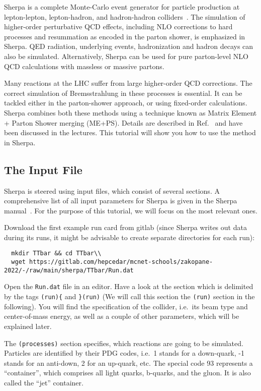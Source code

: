 \documentclass[10pt]{article}
\begin{document}
Sherpa is a complete Monte-Carlo event generator for particle production at
lepton-lepton, lepton-hadron, and hadron-hadron colliders~\cite{Gleisberg:2008ta}.
The simulation of higher-order perturbative QCD effects, including NLO corrections 
to hard processes and resummation as encoded in the parton shower, is emphasized 
in Sherpa. QED radiation, underlying events, hadronization and hadron decays can
also be simulated. Alternatively, Sherpa can be used for pure parton-level NLO QCD 
calculations with massless or massive partons.

Many reactions at the LHC suffer from large higher-order QCD corrections.
The correct simulation of Bremsstrahlung in these processes is essential. It can 
be tackled either in the parton-shower approach, or using fixed-order calculations.
Sherpa combines both these methods using a technique known as Matrix Element + 
Parton Shower merging (ME+PS). Details are described in Ref.~\cite{Buckley:2011ms}
and have been discussed in the lectures. This tutorial will show
you how to use the method in Sherpa.

\subsection{The Input File}

Sherpa is steered using input files, which consist of several sections.
A comprehensive list of all input parameters for Sherpa is given in the
Sherpa manual~\cite{SherpaManual}. For the purpose of this tutorial, 
we will focus on the most relevant ones.

Download the first example run card from gitlab (since Sherpa writes out data
during its runs, it might be advisable to create separate directories for each run):
%
\begin{verbatim}
  mkdir TTbar && cd TTbar\\
  wget https://gitlab.com/hepcedar/mcnet-schools/zakopane-2022/-/raw/main/sherpa/TTbar/Run.dat
\end{verbatim}

Open the {\tt Run.dat} file in an editor. Have a look at the section which is
delimited by the tags {\tt(run)\{} and {\tt \}(run)} (We will call this section
the {\tt(run)} section in the following).  You will find the specification of
the collider, i.e.\ its beam type and center-of-mass  energy, as well as a
couple of other parameters, which will be explained later. 

The {\tt(processes)} section specifies, which reactions are going to be simulated.
Particles are identified by their PDG codes, i.e.\ 1 stands for a down-quark, 
-1 stands for an anti-down, 2 for an up-quark, etc. 
The special code 93 represents a ``container'', which comprises all light quarks,
b-quarks, and the gluon. It is also called the ``jet'' container.
\end{document}
